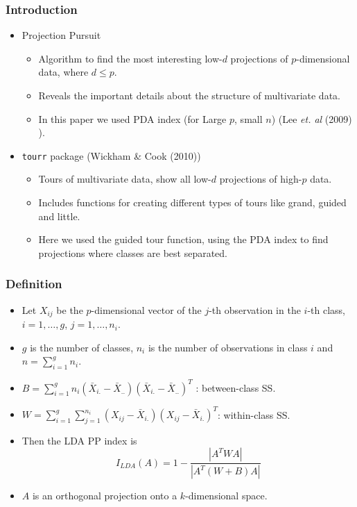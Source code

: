 \documentclass{beamer}
\begin{document}
\begin{frame}
\frametitle{Introduction}
\begin{itemize}
\item Projection Pursuit 
			\begin{itemize}
			\item Algorithm to find the most interesting low-$d$ projections of $p$-dimensional data,  where $d \le p$.
			\item Reveals the important details about the structure of multivariate data.
			\item In this paper we used PDA index (for Large $p$, small $n$) (Lee {\em et. al} (2009) ).
			\end{itemize}		
\item \texttt{tourr} package (Wickham \& Cook (2010)) 
			\begin{itemize}
			\item Tours of multivariate data, show all low-$d$ projections of high-$p$ data.  
			\item Includes functions for creating different types of tours like grand, guided and little.
			\item Here we used the guided tour function, using the PDA index to find projections where classes are best separated.
			\end{itemize}
\end{itemize}
\end{frame}


\begin{frame}
\frametitle{Definition}
\begin{itemize}
\item Let $X_{ij}$ be the $p$-dimensional vector of the $j$-th observation in the $i$-th class, $i = 1, \dots, g$, $j = 1, \dots, n_i$.
\item $g$ is the number of classes, $n_i$ is the number of observations in class $i$ and $n = \sum_{i=1}^g n_i$.
\item $B = \sum_{i=1}^g n_i (\bar{X}_{i.} - \bar{X}_{..})(\bar{X}_{i.} - \bar{X}_{..})^T$ : between-class SS.
\item $W = \sum_{i=1}^g \sum_{j=1}^{n_i} (X_{ij} - \bar{X}_{i.})(X_{ij} - \bar{X}_{i.})^T$: within-class SS.
\item Then the LDA PP index is 
$$I_{LDA}(A) = 1 - \frac{|A^TWA|}{|A^T(W + B)A|}$$
\item $A$ is an orthogonal projection onto a $k$-dimensional space.
\end{itemize}
\end{frame}
\end{document}

